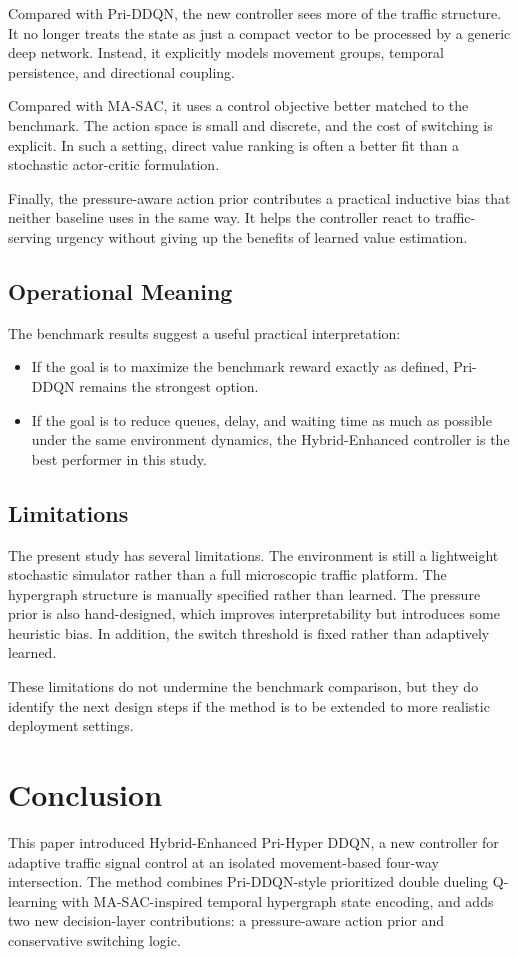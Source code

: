 \documentclass[conference]{IEEEtran}
\begin{document}
Compared with Pri-DDQN, the new controller sees more of the traffic
structure. It no longer treats the state as just a compact vector to
be processed by a generic deep network. Instead, it explicitly models
movement groups, temporal persistence, and directional coupling.

Compared with MA-SAC, it uses a control objective better matched to
the benchmark. The action space is small and discrete, and the cost
of switching is explicit. In such a setting, direct value ranking is
often a better fit than a stochastic actor-critic formulation.

Finally, the pressure-aware action prior contributes a practical
inductive bias that neither baseline uses in the same way. It helps
the controller react to traffic-serving urgency without giving up the
benefits of learned value estimation.

\subsection{Operational Meaning}
The benchmark results suggest a useful practical interpretation:

\begin{itemize}
\item If the goal is to maximize the benchmark reward exactly as
defined, Pri-DDQN remains the strongest option.
\item If the goal is to reduce queues, delay, and waiting time as
much as possible under the same environment dynamics, the
Hybrid-Enhanced controller is the best performer in this study.
\end{itemize}

\subsection{Limitations}
The present study has several limitations. The environment is still a
lightweight stochastic simulator rather than a full microscopic
traffic platform. The hypergraph structure is manually specified
rather than learned. The pressure prior is also hand-designed, which
improves interpretability but introduces some heuristic bias. In
addition, the switch threshold is fixed rather than adaptively
learned.

These limitations do not undermine the benchmark comparison, but they
do identify the next design steps if the method is to be extended to
more realistic deployment settings.

\section{Conclusion}
This paper introduced Hybrid-Enhanced Pri-Hyper DDQN, a new
controller for adaptive traffic signal control at an isolated
movement-based four-way intersection. The method combines
Pri-DDQN-style prioritized double dueling Q-learning with
MA-SAC-inspired temporal hypergraph state encoding, and adds two new
decision-layer contributions: a pressure-aware action prior and
conservative switching logic.
\end{document}
